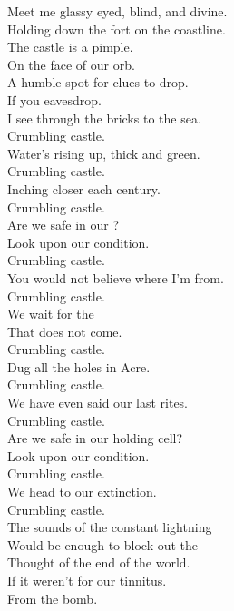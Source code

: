 
\label{album:polygondwanaland}




Meet me glassy eyed, blind, and divine. \\
Holding down the fort on the coastline. \\
The castle is a pimple. \\
On the face of our orb. \\
A humble spot for clues to drop. \\
If you eavesdrop. \\

I see through the bricks to the sea. \\
Crumbling castle. \\
Water's rising up, thick and green. \\
Crumbling castle. \\
Inching closer each century. \\
Crumbling castle. \\
Are we safe in our ? \\
Look upon our condition. \\
Crumbling castle. \\
You would not believe where I'm from. \\
Crumbling castle. \\

We wait for the  \\
That does not come. \\
Crumbling castle. \\
Dug all the holes in  Acre. \\
Crumbling castle. \\
We have even said our last rites. \\
Crumbling castle. \\
Are we safe in our holding cell? \\
Look upon our condition. \\
Crumbling castle. \\
We head to our extinction. \\
Crumbling castle. \\

The sounds of the constant lightning \\
Would be enough to block out the \\
Thought of the end of the world. \\
If it weren't for our tinnitus. \\
From the bomb. \\

